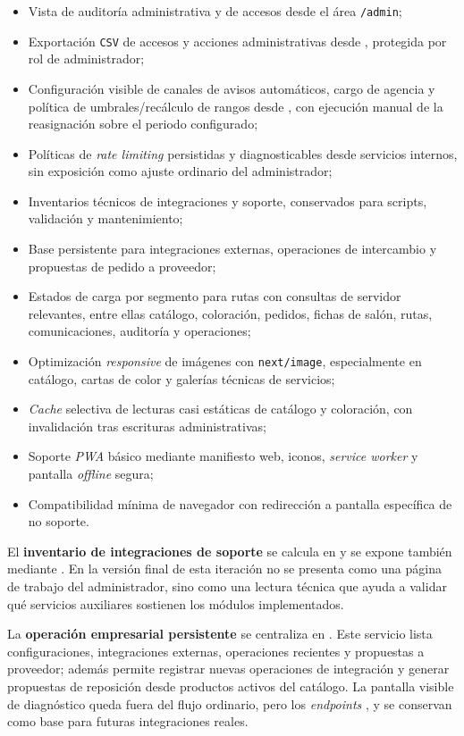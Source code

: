 \begin{itemize}
    \item Vista de auditoría administrativa y de accesos desde el área \texttt{/admin};
    \item Exportación \texttt{CSV} de accesos y acciones administrativas desde , protegida por rol de administrador;
    \item Configuración visible de canales de avisos automáticos, cargo de agencia y política de umbrales/recálculo de rangos desde , con ejecución manual de la reasignación sobre el periodo configurado;
    \item Políticas de \textit{rate limiting} persistidas y diagnosticables desde servicios internos, sin exposición como ajuste ordinario del administrador;
    \item Inventarios técnicos de integraciones y soporte, conservados para scripts, validación y mantenimiento;
    \item Base persistente para integraciones externas, operaciones de intercambio y propuestas de pedido a proveedor;
    \item Estados de carga por segmento para rutas con consultas de servidor relevantes, entre ellas catálogo, coloración, pedidos, fichas de salón, rutas, comunicaciones, auditoría y operaciones;
    \item Optimización \textit{responsive} de imágenes con \texttt{next/image}, especialmente en catálogo, cartas de color y galerías técnicas de servicios;
    \item \textit{Cache} selectiva de lecturas casi estáticas de catálogo y coloración, con invalidación tras escrituras administrativas;
    \item Soporte \textit{PWA} básico mediante manifiesto web, iconos, \textit{service worker} y pantalla \textit{offline} segura;
    \item Compatibilidad mínima de navegador con redirección a pantalla específica de no soporte.
\end{itemize}

El \textbf{inventario de integraciones de soporte} se calcula en  y se expone también mediante . En la versión final de esta iteración no se presenta como una página de trabajo del administrador, sino como una lectura técnica que ayuda a validar qué servicios auxiliares sostienen los módulos implementados.

La \textbf{operación empresarial persistente} se centraliza en . Este servicio lista configuraciones, integraciones externas, operaciones recientes y propuestas a proveedor; además permite registrar nuevas operaciones de integración y generar propuestas de reposición desde productos activos del catálogo. La pantalla visible de diagnóstico queda fuera del flujo ordinario, pero los \textit{endpoints} ,  y  se conservan como base para futuras integraciones reales.

